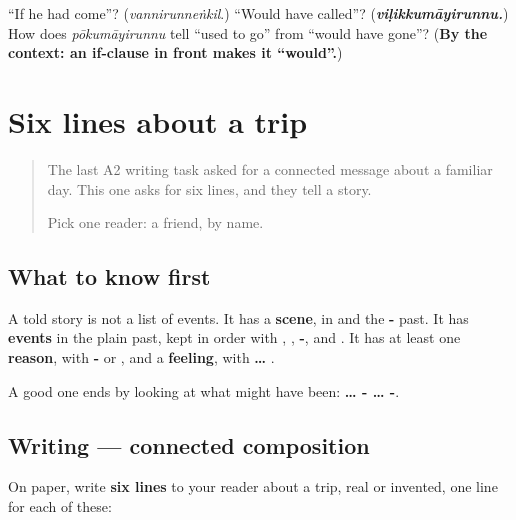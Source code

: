 \begin{tcolorbox}[breakable,colback=teal!4,colframe=teal!35!black,title={Before you move on}]
\textquotedblleft{}If he had come\textquotedblright{}? (\emph{vannirunneṅkil}.) \textquotedblleft{}Would have called\textquotedblright{}? (\emph{\textbf{viḷikkumāyirunnu.}}) How does \emph{pōkumāyirunnu} tell \textquotedblleft{}used to go\textquotedblright{} from \textquotedblleft{}would have gone\textquotedblright{}? (\textbf{By the context: an if-clause in front makes it \textquotedblleft{}would\textquotedblright{}.})
\end{tcolorbox}
\section[(six lines)]{Six lines about a trip}

\label{lesson:ML-W348-six-lines}



\begin{quote}
The last A2 writing task asked for a connected message about a familiar day. This one asks for six lines, and they tell a story.

Pick one reader: a friend, by name.
\end{quote}

\subsection*{What to know first}
A told story is not a list of events. It has a \textbf{scene}, in \textbf{} and the \textbf{-} past. It has \textbf{events} in the plain past, kept in order with \textbf{}, \textbf{}, \textbf{-}, \textbf{} and \textbf{}. It has at least one \textbf{reason}, with \textbf{-} or \textbf{}, and a \textbf{feeling}, with \textbf{ … }.

A good one ends by looking at what might have been: \textbf{… - … -}.

\subsection*{Writing — connected composition}
On paper, write \textbf{six lines} to your reader about a trip, real or invented, one line for each of these:

